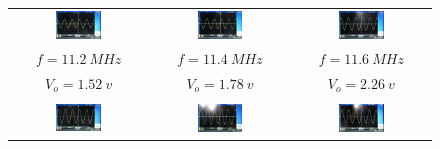 \documentclass[12pt]{article}%
\numberwithin{equation}{section}
\begin{document}
\begin{enumerate}
\begin{figure}[htbp]
\centering
\begin{tabular}{ccc}
 \includegraphics[width=0.35\textwidth]{gaopin2/gaopin213.jpg} &\includegraphics[width=0.35\textwidth]{gaopin2/gaopin223.jpg}&\includegraphics[width=0.35\textwidth]{gaopin2/gaopin212.jpg} \\ 
$f=11.2\ MHz$ & $f=11.4\ MHz$ & $f=11.6\ MHz$ \\
$V_o=1.52\ v$ & $V_o=1.78\ v$ & $V_o=2.26\ v$ \\
\\
 \includegraphics[width=0.35\textwidth]{gaopin2/gaopin206.jpg} &\includegraphics[width=0.35\textwidth]{gaopin2/gaopin208.jpg}&\includegraphics[width=0.35\textwidth]{gaopin2/gaopin220.jpg} \\ 

\end{tabular}
\end{figure}
\end{enumerate}
\end{document}
